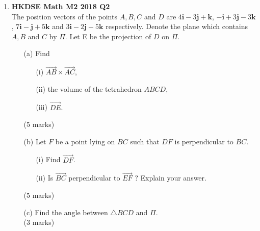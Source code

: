 \documentclass[12pt]{article}
\begin{document}
\begin{enumerate}
	\item \textbf{HKDSE Math M2 2018 Q2}\\
	The position vectors of the points $A, B, C$ and $D$ are  
	$4\textbf{i} -3 \textbf{j} + \textbf {k}$, 
	$-\textbf{i} +3 \textbf{j} -3 \textbf {k}$, 
	$7\textbf{i} - \textbf{j} +5 \textbf {k}$ and 
	$3\textbf{i} -2 \textbf{j} -5 \textbf {k}$  
	respectively. Denote the plane which contains $A, B$ and $C$ by $\Pi$. Let E be the projection of  $D$ on $\Pi$.
	\begin{enumerate}
		\item [(a)]Find
		\begin{enumerate}
			\item [(i)]$\overrightarrow{AB} \times \overrightarrow{AC}$,
			\item [(ii)]the volume of the tetrahedron $ABCD$,
			\item [(iii)]$\overrightarrow{DE}$.
		\end{enumerate}
		(5 marks)
		\item [(b)]Let $F$ be a point lying on $BC$ such that $DF$ is perpendicular to $BC$.
		\begin{enumerate}
			\item [(i)]Find $\overrightarrow{DF}$. 
			\item [(ii)]Is $\overrightarrow{BC} $ perpendicular to $\overrightarrow{EF}$ ? Explain your answer.
		\end{enumerate}
		(5 marks)
		\item[(c)]Find the angle between $\triangle BCD$ and $\Pi$. \\(3 marks)
	\end{enumerate}
\end{enumerate}
\end{document}
